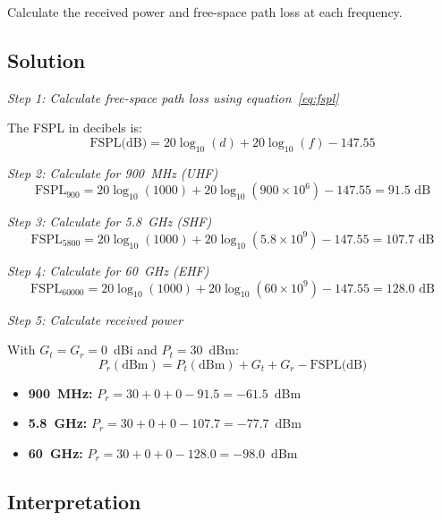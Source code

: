 Calculate the received power and free-space path loss at each frequency.

\subsection*{Solution}

\textit{Step 1: Calculate free-space path loss using equation~\ref{eq:fspl}}

The FSPL in decibels is:
\begin{equation}
\text{FSPL(dB)} = 20\log_{10}(d) + 20\log_{10}(f) - 147.55
\label{eq:fspl}
\end{equation}

\textit{Step 2: Calculate for 900~MHz (UHF)}
\begin{equation}
\text{FSPL}_{900} = 20\log_{10}(1000) + 20\log_{10}(900 \times 10^6) - 147.55 = 91.5 \text{ dB}
\end{equation}

\textit{Step 3: Calculate for 5.8~GHz (SHF)}
\begin{equation}
\text{FSPL}_{5800} = 20\log_{10}(1000) + 20\log_{10}(5.8 \times 10^9) - 147.55 = 107.7 \text{ dB}
\end{equation}

\textit{Step 4: Calculate for 60~GHz (EHF)}
\begin{equation}
\text{FSPL}_{60000} = 20\log_{10}(1000) + 20\log_{10}(60 \times 10^9) - 147.55 = 128.0 \text{ dB}
\end{equation}

\textit{Step 5: Calculate received power}

With $G_t = G_r = 0$~dBi and $P_t = 30$~dBm:
\begin{equation}
P_r(\text{dBm}) = P_t(\text{dBm}) + G_t + G_r - \text{FSPL(dB)}
\end{equation}

\begin{itemize}
\item \textbf{900~MHz:} $P_r = 30 + 0 + 0 - 91.5 = -61.5$~dBm
\item \textbf{5.8~GHz:} $P_r = 30 + 0 + 0 - 107.7 = -77.7$~dBm
\item \textbf{60~GHz:} $P_r = 30 + 0 + 0 - 128.0 = -98.0$~dBm
\end{itemize}

\subsection*{Interpretation}

